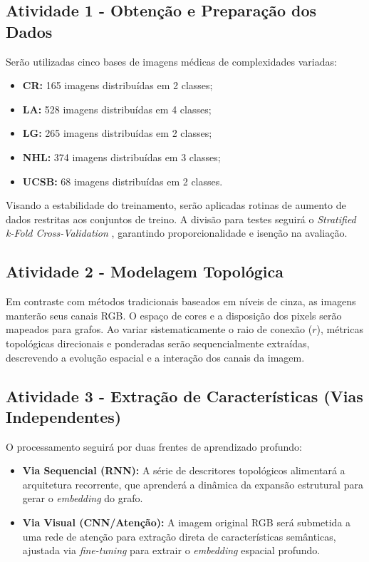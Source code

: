 \documentclass[a4paper,12pt]{article}
\begin{document}
\subsection{Atividade 1 - Obtenção e Preparação dos Dados} 
Serão utilizadas cinco bases de imagens médicas de complexidades variadas: 

\begin{itemize}
    \item \textbf{CR:} 165 imagens distribuídas em 2 classes;
    \item \textbf{LA:} 528 imagens distribuídas em 4 classes;
    \item \textbf{LG:} 265 imagens distribuídas em 2 classes;
    \item \textbf{NHL:} 374 imagens distribuídas em 3 classes;
    \item \textbf{UCSB:} 68 imagens distribuídas em 2 classes.
\end{itemize}


Visando a estabilidade do treinamento, serão aplicadas rotinas de aumento de dados restritas aos conjuntos de treino. A divisão para testes seguirá o \textit{Stratified k-Fold Cross-Validation} \cite{kohavi1995study}, garantindo proporcionalidade e isenção na avaliação.

\subsection{Atividade 2 - Modelagem Topológica} 
Em contraste com métodos tradicionais baseados em níveis de cinza, as imagens manterão seus canais RGB. O espaço de cores e a disposição dos pixels serão mapeados para grafos. Ao variar sistematicamente o raio de conexão ($r$), métricas topológicas direcionais e ponderadas serão sequencialmente extraídas, descrevendo a evolução espacial e a interação dos canais da imagem.

\subsection{Atividade 3 - Extração de Características (Vias Independentes)} 
O processamento seguirá por duas frentes de aprendizado profundo:
\begin{itemize}
    \item \textbf{Via Sequencial (RNN):} A série de descritores topológicos alimentará a arquitetura recorrente, que aprenderá a dinâmica da expansão estrutural para gerar o \textit{embedding} do grafo.
    \item \textbf{Via Visual (CNN/Atenção):} A imagem original RGB será submetida a uma rede de atenção para extração direta de características semânticas, ajustada via \textit{fine-tuning} para extrair o \textit{embedding} espacial profundo.
\end{itemize}
\end{document}
